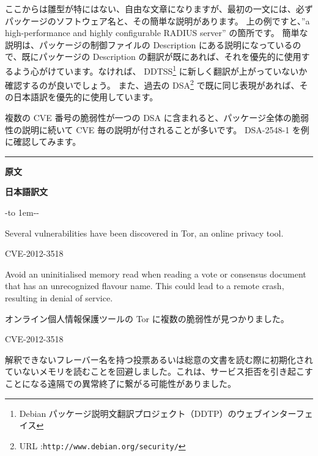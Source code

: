 \documentclass[mingoth,a4paper]{jsarticle}
\begin{document}
\vspace{1em}\par

ここからは雛型が特にはない、自由な文章になりますが、最初の一文には、必ずパッケージのソフトウェア名と、その簡単な説明があります。
上の例ですと、''a high-performance and highly configurable RADIUS server'' の箇所です。
簡単な説明は、パッケージの制御ファイルの Description にある説明になっているので、既にパッケージの Description の翻訳が既にあれば、それを優先的に使用するよう心がけています。なければ、 DDTSS\footnote{Debian パッケージ説明文翻訳プロジェクト（DDTP）のウェブインターフェイス} に新しく翻訳が上がっていないか確認するのが良いでしょう。
また、過去の DSA\footnote{URL :\tt http://www.debian.org/security/} で既に同じ表現があれば、その日本語訳を優先的に使用しています。


複数の CVE 番号の脆弱性が一つの DSA に含まれると、パッケージ全体の脆弱性の説明に続いて CVE 毎の説明が付されることが多いです。 DSA-2548-1 を例に確認してみます。

\vspace{1ex}
\pagebreak[2]
\clearpage

\hrule
{}\par
\parbox[t]{0.48\linewidth}{{\bf 原文}}\hfil \parbox{0.48\linewidth}{\bf 日本語訳文}\par\vspace{0.1em}

-\leaders\hbox to 1em{\hss{}-\hss}\hfill -\par
\parbox[t]{0.47\linewidth}{
Several vulnerabilities have been discovered in Tor, an online privacy
tool.

\begin{list}{}{\setlength{\labelwidth}{16ex}\setlength{\labelsep}{1ex}
\setlength{\leftmargin}{8ex}\setlength{\itemindent}{4em}}
\item[CVE-2012-3518]\hfil\par

  Avoid an uninitialised memory read when reading a vote or consensus  document that has an unrecognized flavour name. This could lead to a remote crash, resulting in denial of service.
\end{list}
}\hfil
\parbox[t]{0.47\linewidth}{
オンライン個人情報保護ツールの Tor に複数の脆弱性が見つかりました。

\begin{list}{}{\setlength{\labelwidth}{16ex}\setlength{\labelsep}{1ex}
\setlength{\leftmargin}{8ex}\setlength{\itemindent}{4em}}
\item[CVE-2012-3518]\hfil\par

  解釈できないフレーバー名を持つ投票あるいは総意の文書を読む際に初期化されていないメモリを読むことを回避しました。これは、サービス拒否を引き起こすことになる遠隔での異常終了に繋がる可能性がありました。
\end{list}
}\hfil
\end{document}

